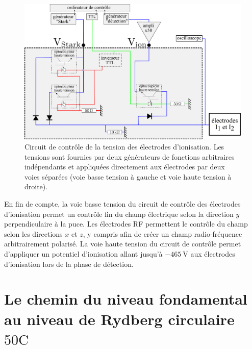 %
\begin{figure}
\centering
\includegraphics[width=\linewidth]{figures/circulars/detectionbox_CdF}
\caption[Second circuit de contrôle de la tension des électrodes d'ionisation]{
Circuit de contrôle de la tension des électrodes d'ionisation.
Les tensions sont fournies par deux générateurs de fonctions arbitraires indépendants et appliquées directement aux électrodes par deux voies séparées (voie basse tension à gauche et voie haute tension à droite).
}
\label{fig:detectionbox_CdF}
\end{figure}

En fin de compte, la voie basse tension du circuit de contrôle des électrodes d'ionisation permet un contrôle fin du champ électrique selon la direction $y$ perpendiculaire à la puce.
Les électrodes RF permettent le contrôle du champ selon les directions $x$ et $z$, y compris afin de créer un champ radio-fréquence arbitrairement polarisé.
La voie haute tension du circuit de contrôle permet d'appliquer un potentiel d'ionisation allant jusqu'à $\SI{-465}{\V}$ aux électrodes d'ionisation lors de la phase de détection.


\clearpage
\section{Le chemin du niveau fondamental au niveau de Rydberg circulaire $\mathrm{50C}$}\label{sec:groundtocirc}
%

